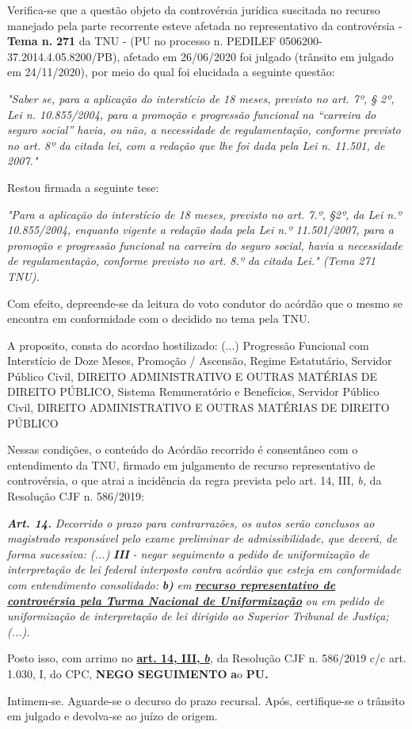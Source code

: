 \documentclass[12pt]{article}
\begin{document}
\justifying
\noindent Verifica-se que a questão objeto da controvérsia jurídica suscitada no recurso manejado pela parte recorrente esteve afetada no representativo da controvérsia - \textbf{Tema n. }\textbf{271} da TNU - (PU no processo n. PEDILEF 0506200-37.2014.4.05.8200/PB),  afetado em 26/06/2020 foi julgado (trânsito em julgado em 24/11/2020), por meio do qual foi elucidada a seguinte questão:

\noindent \textit{"Saber se, para a aplicação do interstício de 18 meses, previsto no art. 7º, § 2º, Lei n. 10.855/2004, para a promoção e progressão funcional na “carreira do seguro social” havia, ou não, a necessidade de regulamentação, conforme previsto no art. 8º da citada lei, com a redação que lhe foi dada pela Lei n. 11.501, de 2007."}

\noindent Restou firmada a seguinte tese:

\noindent \textit{"Para a aplicação do interstício de 18 meses, previsto no art. 7.º, §2º, da Lei n.º 10.855/2004, enquanto vigente a redação dada pela Lei n.º 11.501/2007, para a promoção e progressão funcional na carreira do seguro social, havia a necessidade de regulamentação, conforme previsto no art. 8.º da citada Lei." (Tema 271 TNU).}

\noindent Com efeito, depreende-se da leitura do voto condutor do acórdão que o mesmo se encontra em conformidade com o decidido no  tema pela TNU.

\noindent A proposito, consta do acordao hostilizado: (...) Progressão Funcional com Interstício de Doze Meses, Promoção / Ascensão, Regime Estatutário, Servidor Público Civil, DIREITO ADMINISTRATIVO E OUTRAS MATÉRIAS DE DIREITO PÚBLICO, Sistema Remuneratório e Benefícios, Servidor Público Civil, DIREITO ADMINISTRATIVO E OUTRAS MATÉRIAS DE DIREITO PÚBLICO

\noindent Nessas condições, o conteúdo do Acórdão recorrido é consentâneo com o entendimento da TNU, firmado em julgamento de recurso representativo de controvérsia, o que atrai a incidência da regra prevista pelo art. 14, III, \textit{b,} da Resolução CJF n. 586/2019:

\noindent \textit{\textbf{Art. 14.}}\textit{ Decorrido o prazo para contrarrazões, os autos serão conclusos ao magistrado responsável pelo exame preliminar de admissibilidade, que deverá, de forma sucessiva: (...) }\textit{\textbf{III }}\textit{- negar seguimento a pedido de uniformização de interpretação de lei federal interposto contra acórdão que esteja em conformidade com entendimento consolidado: }\textit{\textbf{b)}}\textit{ em }\uline{\textit{\textbf{recurso representativo de controvérsia pela Turma Nacional de Uniformização}}}\textit{ ou em pedido de uniformização de interpretação de lei dirigido ao Superior Tribunal de Justiça;(...).}

\noindent Posto isso, com arrimo no \uline{\textbf{art. 14, III, }}\uline{\textit{\textbf{b}}}\textit{,} da Resolução CJF n. 586/2019 c/c art. 1.030, I, do CPC, \textbf{NEGO SEGUIMENTO }\textbf{a}o\textbf{ PU}\textbf{.}

\noindent Intimem-se. Aguarde-se o decurso do prazo recursal. Após, certifique-se o trânsito em julgado e devolva-se ao juízo de origem.
\end{document}
